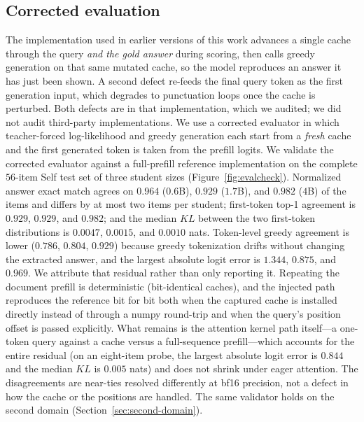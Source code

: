 \documentclass[11pt]{article}
\begin{document}
\subsection{Corrected evaluation}
\label{sec:eval-protocol}
The implementation used in earlier versions of this work advances a single cache
through the query \emph{and the gold answer} during scoring, then calls greedy
generation on that same mutated cache, so the model reproduces an answer it has
just been shown. A second defect re-feeds the final query token as the first
generation input, which degrades to punctuation loops once the cache is
perturbed. Both defects are in that implementation, which we audited; we did not
audit third-party implementations. We use a corrected evaluator in which
teacher-forced log-likelihood and greedy generation each start from a
\emph{fresh} cache and the first generated token is taken from the prefill
logits. We validate the corrected evaluator against a full-prefill reference
implementation on the complete $56$-item Self test set of three student sizes
(Figure~\ref{fig:evalcheck}). Normalized answer exact match agrees on $0.964$
($0.6$B), $0.929$ ($1.7$B), and $0.982$ ($4$B) of the items and differs by at
most two items per student; first-token top-1 agreement is $0.929$, $0.929$, and
$0.982$; and the median $KL$ between the two first-token distributions is
$0.0047$, $0.0015$, and $0.0010$ nats. Token-level greedy agreement is lower
($0.786$, $0.804$, $0.929$) because greedy tokenization drifts without changing
the extracted answer, and the largest absolute logit error is $1.344$, $0.875$,
and $0.969$. We attribute that residual rather than only reporting it. Repeating
the document prefill is deterministic (bit-identical caches), and the injected
path reproduces the reference bit for bit both when the captured cache is
installed directly instead of through a numpy round-trip and when the query's
position offset is passed explicitly. What remains is the attention kernel path
itself---a one-token query against a cache versus a full-sequence prefill---which
accounts for the entire residual (on an eight-item probe, the largest absolute
logit error is $0.844$ and the median $KL$ is $0.005$ nats) and does not shrink
under eager attention. The disagreements are near-ties resolved differently at bf16
precision, not a defect in how the cache or the positions are handled. The same
validator holds on the second domain (Section~\ref{sec:second-domain}).
\end{document}
